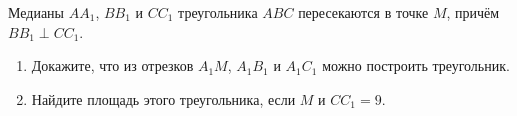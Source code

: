 \begin{ex}
	\begin{condition}
		Медианы \( AA_1 \), \( BB_1  \) и \( CC_1  \) треугольника \( ABC  \) пересекаются в точке \( M \), причём \( BB_1 \perp CC_1 \).
		\begin{enumerate}
			\item Докажите, что из отрезков \( A_1M \), \( A_1B_1  \) и \( A_1C_1  \) можно построить треугольник.
			\item Найдите площадь этого треугольника, если \( M  \) и \( CC_1=9 \).
		\end{enumerate}
	\end{condition}
\end{ex}